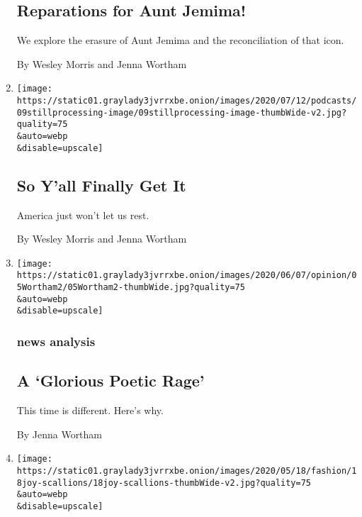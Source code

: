 \begin{enumerate}
{  \subsection{Reparations for Aunt
  Jemima!}\label{reparations-for-aunt-jemima}}

  We explore the erasure of Aunt Jemima and the reconciliation of that
  icon.

  By Wesley Morris and Jenna Wortham
\item
  \href{/2020/07/09/podcasts/still-processing-black-lives-matter.html}{}

  \texttt{[image: https://static01.graylady3jvrrxbe.onion/images/2020/07/12/podcasts/09stillprocessing-image/09stillprocessing-image-thumbWide-v2.jpg?quality=75\\\&auto=webp\\\&disable=upscale]}

  \hypertarget{so-yall-finally-get-it}{%
  \subsection{So Y'all Finally Get It}\label{so-yall-finally-get-it}}

  America just won't let us rest.

  By Wesley Morris and Jenna Wortham
\item
  \href{/2020/06/05/sunday-review/black-lives-matter-protests-floyd.html}{}

  \texttt{[image: https://static01.graylady3jvrrxbe.onion/images/2020/06/07/opinion/05Wortham2/05Wortham2-thumbWide.jpg?quality=75\\\&auto=webp\\\&disable=upscale]}

  \hypertarget{news-analysis}{%
  \subsubsection{news analysis}\label{news-analysis}}

  \hypertarget{a-glorious-poetic-rage}{%
  \subsection{A `Glorious Poetic Rage'}\label{a-glorious-poetic-rage}}

  This time is different. Here's why.

  By Jenna Wortham
\item
  \href{/2020/05/18/style/regrowing-scallions-joy.html}{}

  \texttt{[image: https://static01.graylady3jvrrxbe.onion/images/2020/05/18/fashion/18joy-scallions/18joy-scallions-thumbWide-v2.jpg?quality=75\\\&auto=webp\\\&disable=upscale]}


\end{enumerate}
